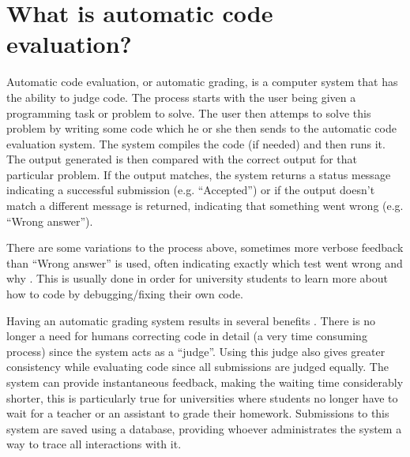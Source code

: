 \section{What is automatic code evaluation?}
Automatic code evaluation, or automatic grading, is a computer system that has the ability to judge code. The process starts with the user being given a programming task or problem to solve. The user then attemps to solve this problem by writing some code which he or she then sends to the automatic code evaluation system. The system compiles the code (if needed) and then runs it. The output generated is then compared with the correct output for that particular problem. If the output matches, the system returns a status message indicating a successful submission (e.g. ``Accepted'') or if the output doesn't match a different message is returned, indicating that something went wrong (e.g. ``Wrong answer''). 

There are some variations to the process above, sometimes more verbose feedback than ``Wrong answer'' is used, often indicating exactly which test went wrong and why \cite{Gradebot}. This is usually done in order for university students to learn more about how to code by debugging/fixing their own code.

Having an automatic grading system results in several benefits \cite{Suleman}. There is no longer a need for humans correcting code in detail (a very time consuming process) since the system acts as a ``judge''. Using this judge also gives greater consistency while evaluating code since all submissions are judged equally. The system can provide instantaneous feedback, making the waiting time considerably shorter, this is particularly true for universities where students no longer have to wait for a teacher or an assistant to grade their homework. Submissions to this system are saved using a database, providing whoever administrates the system a way to trace all interactions with it.
